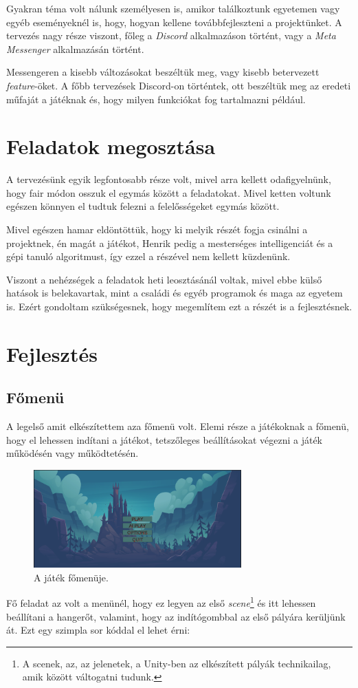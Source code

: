 \documentclass[]{thesis-ekf}
\theoremstyle{definition}
\begin{document}
	Gyakran téma volt nálunk személyesen is, amikor találkoztunk egyetemen vagy egyéb eseményeknél is, hogy, hogyan kellene továbbfejleszteni a projektünket. A tervezés nagy része viszont, főleg a \emph{Discord} alkalmazáson történt, vagy a \emph{Meta Messenger} alkalmazásán történt.
	
	Messengeren a kisebb változásokat beszéltük meg, vagy kisebb betervezett \emph{feature}-öket. A főbb tervezések Discord-on történtek, ott beszéltük meg az eredeti műfaját a játéknak és, hogy milyen funkciókat fog tartalmazni például.
	
	\section{Feladatok megosztása}
	A tervezésünk egyik legfontosabb része volt, mivel arra kellett odafigyelnünk, hogy fair módon osszuk el egymás között a feladatokat. Mivel ketten voltunk egészen könnyen el tudtuk felezni a felelősségeket egymás között.
	
	Mivel egészen hamar eldöntöttük, hogy ki melyik részét fogja csinálni a projektnek, én magát a játékot, Henrik pedig a mesterséges intelligenciát és a gépi tanuló algoritmust, így ezzel a részével nem kellett küzdenünk.
	
	Viszont a nehézségek a feladatok heti leosztásánál voltak, mivel ebbe külső hatások is belekavartak, mint a családi és egyéb programok és maga az egyetem is. Ezért gondoltam szükségesnek, hogy megemlítem ezt a részét is a fejlesztésnek.
	
	\section{Fejlesztés}
	
	\subsection{Főmenü}
	A legelső amit elkészítettem aza főmenü volt. Elemi része a játékoknak a főmenü, hogy el lehessen indítani a játékot, tetszőleges beállításokat végezni a játék működésén vagy működtetésén.
	
	\begin{figure}[!ht]
		\label{kep:mainmenu}
		\centering
		\includegraphics[width=8cm]{mainmenu}
		\caption{A játék főmenüje.}
	\end{figure}
	\pagebreak
	Fő feladat az volt a menünél, hogy ez legyen az első \emph{scene}\footnote{A scenek, az, az jelenetek, a Unity-ben az elkészített pályák technikailag, amik között váltogatni tudunk.} és itt lehessen beállítani a hangerőt, valamint, hogy az indítógombbal az első pályára kerüljünk át. Ezt egy szimpla sor kóddal el lehet érni:
	
\end{document}
